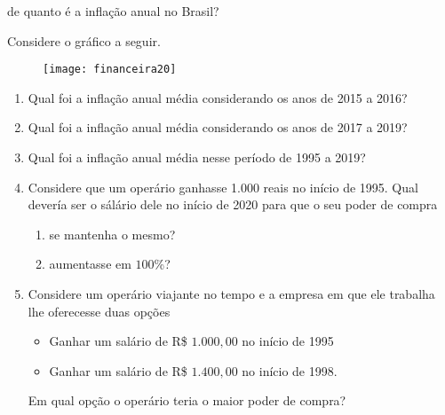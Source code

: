 \begin{task}{de quanto é a inflação anual no Brasil?}
\label{fin-ativ-34}

Considere o gráfico a seguir.

\begin{figure}[H]
\centering

\texttt{[image: financeira20]}
\end{figure}

\begin{enumerate}
  \item Qual foi a inflação anual média considerando os anos de 2015 a 2016?
  \item Qual foi a inflação anual média considerando os anos de 2017 a 2019?
  \item Qual foi a inflação anual média nesse período de 1995 a 2019?
  \item Considere que um operário ganhasse 1.000 reais no início de 1995. Qual devería ser o sálário dele no início de 2020 para que o seu poder de compra
  \begin{enumerate}
    \item se mantenha o mesmo?
    \item aumentasse em $100$\%?
  \end{enumerate}
  \item Considere um operário viajante no tempo e a empresa em que ele trabalha lhe oferecesse duas opções
  \begin{itemize}
    \item Ganhar um salário de R\$ $1.000{,}00$ no início de 1995
    \item Ganhar um salário de R\$ $1.400{,}00$ no início de 1998.
  \end{itemize}
  Em qual opção o operário teria o maior poder de compra?
\end{enumerate}
\end{task}



